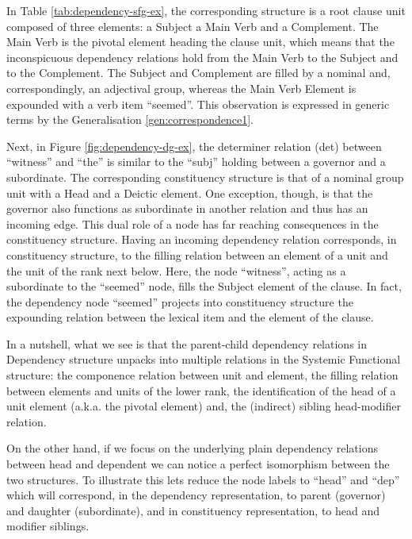     In Table \ref{tab:dependency-sfg-ex}, the corresponding structure is a root clause unit composed of three elements: a Subject a Main Verb and a Complement. The Main Verb is the pivotal element heading the clause unit, which means that the inconspicuous dependency relations hold from the Main Verb to the Subject and to the Complement. The Subject and Complement are filled by a nominal and, correspondingly, an adjectival group, whereas the Main Verb Element is expounded with a verb item ``seemed''. This observation is expressed in generic terms by the Generalisation \ref{gen:correspondence1}. 

    Next, in Figure \ref{fig:dependency-dg-ex}, the determiner relation (det) between ``witness'' and ``the'' is similar to the ``subj'' holding between a governor and a subordinate. The corresponding constituency structure is that of a nominal group unit with a Head and a Deictic element. One exception, though, is that the governor also functions as subordinate in another relation and thus has an incoming edge. This dual role of a node has far reaching consequences in the constituency structure. Having an incoming dependency relation corresponds, in constituency structure, to the filling relation between an element of a unit and the unit of the rank next below. Here, the node ``witness'', acting as a subordinate to the ``seemed'' node, fills the Subject element of the clause. In fact, the dependency node ``seemed'' projects into constituency structure the expounding relation between the lexical item and the element of the clause.

    In a nutshell, what we see is that the parent-child dependency relations in Dependency structure unpacks into multiple relations in the Systemic Functional structure: the componence relation between unit and element, the filling relation between elements and units of the lower rank, the identification of the head of a unit element (a.k.a. the pivotal element) and, the (indirect) sibling head-modifier relation.

    On the other hand, if we focus on the underlying plain dependency relations between head and dependent we can notice a perfect isomorphism between the two structures. To illustrate this lets reduce the node labels to ``head'' and ``dep'' which will correspond, in the dependency representation, to parent (governor) and daughter (subordinate), and in constituency representation, to head and modifier siblings. 

